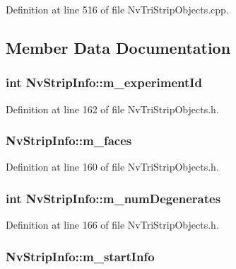 Definition at line 516 of file NvTriStripObjects.cpp.

\subsection{Member Data Documentation}
\hypertarget{class_nv_strip_info_c206788f90d9e14394972cd7ea989c1d}{
\subsubsection[{m\_\-experimentId}]{\setlength{\rightskip}{0pt plus 5cm}int {\bf NvStripInfo::m\_\-experimentId}}}
\label{class_nv_strip_info_c206788f90d9e14394972cd7ea989c1d}




Definition at line 162 of file NvTriStripObjects.h.\hypertarget{class_nv_strip_info_5920a296e1f7f1146893ee6672d76aee}{
\subsubsection[{m\_\-faces}]{ {\bf NvStripInfo::m\_\-faces}}}
\label{class_nv_strip_info_5920a296e1f7f1146893ee6672d76aee}




Definition at line 160 of file NvTriStripObjects.h.\hypertarget{class_nv_strip_info_91a71056da89624852630282c30b3b10}{
\subsubsection[{m\_\-numDegenerates}]{\setlength{\rightskip}{0pt plus 5cm}int {\bf NvStripInfo::m\_\-numDegenerates}}}
\label{class_nv_strip_info_91a71056da89624852630282c30b3b10}




Definition at line 166 of file NvTriStripObjects.h.\hypertarget{class_nv_strip_info_010bfd6d2e52445176a7cbfb79a53d05}{
\subsubsection[{m\_\-startInfo}]{ {\bf NvStripInfo::m\_\-startInfo}}}
\label{class_nv_strip_info_010bfd6d2e52445176a7cbfb79a53d05}




